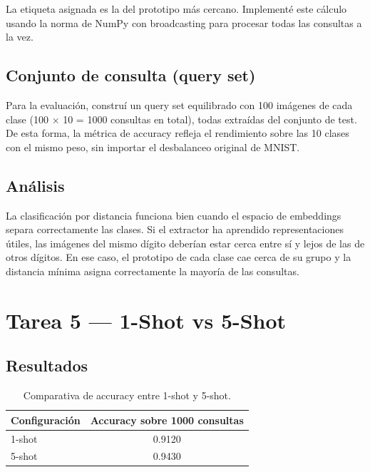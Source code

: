 \documentclass[../../__memoria.tex]{subfiles}
\begin{document}
La etiqueta asignada es la del prototipo más cercano. Implementé este cálculo usando la norma de NumPy con broadcasting para procesar todas las consultas a la vez.

\subsection{Conjunto de consulta (query set)}

Para la evaluación, construí un query set equilibrado con 100 imágenes de cada clase (100 $\times$ 10 = 1000 consultas en total), todas extraídas del conjunto de test. De esta forma, la métrica de accuracy refleja el rendimiento sobre las 10 clases con el mismo peso, sin importar el desbalanceo original de MNIST.

\subsection{Análisis}

La clasificación por distancia funciona bien cuando el espacio de embeddings separa correctamente las clases. Si el extractor ha aprendido representaciones útiles, las imágenes del mismo dígito deberían estar cerca entre sí y lejos de las de otros dígitos. En ese caso, el prototipo de cada clase cae cerca de su grupo y la distancia mínima asigna correctamente la mayoría de las consultas.

\section[Tarea 5: Comparativa]{Tarea 5 --- 1-Shot vs 5-Shot}

\subsection{Resultados}

\begin{table}[H]
    \centering
    \caption{Comparativa de accuracy entre 1-shot y 5-shot.}
    \label{tab:p9_comparativa}
    \begin{tabular}{lc}
        \toprule
        \textbf{Configuración} & \textbf{Accuracy sobre 1000 consultas} \\
        \midrule
        1-shot & 0.9120 \\
        5-shot & 0.9430 \\
        \bottomrule
    \end{tabular}
\end{table}
\end{document}
